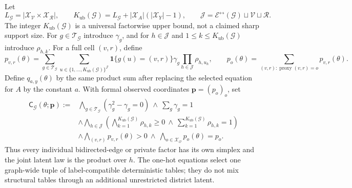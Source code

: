 Let
\[
L_{\mathcal G}=\left|\mathcal X_{\mathcal V}\times\mathcal X_{\mathcal R}\right|,
\qquad
K_{\mathrm{ub}}(\mathcal G)=L_{\mathcal G}+|\mathcal X_A|(|\mathcal X_Y|-1),
\qquad
\mathcal J=\mathcal E^{\leftrightarrow}(\mathcal G)\sqcup\mathcal V\sqcup\mathcal R.
\]
The integer \(K_{\mathrm{ub}}(\mathcal G)\) is a universal factorwise upper bound, not a claimed sharp support size. For \(g\in\mathcal T_{\mathcal G}\) introduce \(\gamma_g\), and for \(h\in\mathcal J\) and \(1\leq k\leq K_{\mathrm{ub}}(\mathcal G)\) introduce \(\rho_{h,k}\). For a full cell \((v,r)\), define
\[
p_{v,r}(\theta)=
\sum_{g\in\mathcal T_{\mathcal G}}
\sum_{u\in\{1,\ldots,K_{\mathrm{ub}}(\mathcal G)\}^{\mathcal J}}
\mathbf 1\{g(u)=(v,r)\}\gamma_g\prod_{h\in\mathcal J}\rho_{h,u_h},
\qquad
p_o(\theta)=\sum_{(v,r):\operatorname{proxy}(v,r)=o}p_{v,r}(\theta).
\]
Define \(q_{a,y}(\theta)\) by the same product sum after replacing the selected equation for \(A\) by the constant \(a\). With formal observed coordinates \(\mathbf p=(p_o)_o\), set
\[
\begin{aligned}
\mathsf C_{\mathcal G}(\theta;\mathbf p):={}&
\bigwedge_{g\in\mathcal T_{\mathcal G}}(\gamma_g^2-\gamma_g=0)
\ \wedge\ \sum_g\gamma_g=1\\
&\wedge\bigwedge_{h\in\mathcal J}
\left(\bigwedge_{k=1}^{K_{\mathrm{ub}}(\mathcal G)}\rho_{h,k}\geq0
\ \wedge\ \sum_{k=1}^{K_{\mathrm{ub}}(\mathcal G)}\rho_{h,k}=1\right)\\
&\wedge\bigwedge_{(v,r)}p_{v,r}(\theta)>0
\ \wedge\ \bigwedge_{o\in\mathcal X_{\mathcal O}}p_o(\theta)=p_o.
\end{aligned}
\]
Thus every individual bidirected-edge or private factor has its own simplex and the joint latent law is the product over \(h\). The one-hot equations select one graph-wide tuple of label-compatible deterministic tables; they do not mix structural tables through an additional unrestricted district latent.